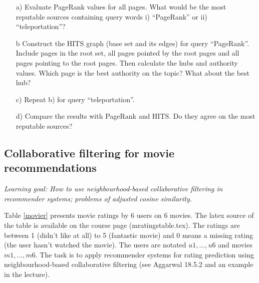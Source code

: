 \documentclass[a4paper,12pt]{article}
\begin{document}
\begin{itemize}
\item[a)] Evaluate PageRank values for all pages. What would be the most reputable sources containing query words i) ``PageRank'' or ii) ``teleportation''?
\item[b] Construct the HITS graph (base set and its edges) for query ``Page\-Rank''. Include pages in the root set, all pages pointed by the root pages and all pages pointing to the root pages. Then calculate the hubs and authority values. Which page is the best authority on the topic? What about the best hub?
\item[c)] Repeat b) for query ``teleportation''. 
\item[d)] Compare the results with PageRank and HITS. Do they agree on the most reputable sources?
\end{itemize}


\subsection{Collaborative filtering for movie recommendations}

{\em Learning goal: How to use neighbourhood-based collaborative filtering in recommender systems; problems of adjusted cosine similarity.} 

Table \ref{movier} presents movie ratings by 6 
users on 6 movies. The latex source of the table is available on the course 
page (mratingstable.tex). The ratings are between 1 (didn't like at all) to 5 
(fantastic movie) and 0 means a missing rating (the user hasn't watched 
the movie). The users are notated $u1,\hdots,u6$ and movies $m1,\hdots,m6$. 
The task is to apply recommender systems for rating  prediction using 
neighbourhood-based collaborative filtering (see Aggarwal 18.5.2 and an 
example in the lecture). 
\end{document}
